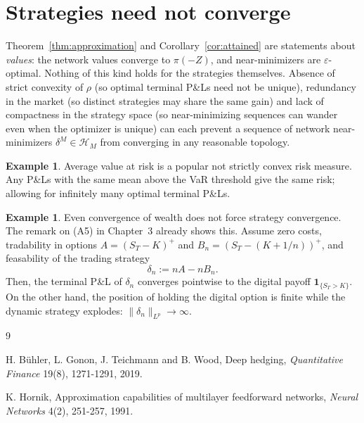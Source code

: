 \documentclass[11pt,a4paper]{report}
\numberwithin{equation}{chapter}
\theoremstyle{plain}
\theoremstyle{definition}
\newtheorem{example}[proposition]{Example}
\newcommand{\HH}{\mathcal{H}}
\begin{document}
\section{Strategies need not converge}
\label{sec:strategies}

Theorem~\ref{thm:approximation} and Corollary~\ref{cor:attained} are
statements about \emph{values}: the network values converge to
$\pi(-Z)$, and near-minimizers are $\varepsilon$-optimal. Nothing of
this kind holds for the strategies themselves. Absence of strict
convexity of $\rho$ (so optimal terminal P\&Ls need not be unique),
redundancy in the market (so distinct strategies may share the same
gain) and lack of compactness in the strategy space (so
near-minimizing sequences can wander even when the optimizer is unique)
can each prevent a sequence of network near-minimizers
$\delta^M\in\HH_M$ from converging in any reasonable topology.

\begin{example}\label{ex:cvar-nonunique}
  Average value at risk is a popular not strictly convex risk measure. Any P\&Ls with the same mean above the VaR threshold give the same risk; allowing for infinitely many optimal terminal P\&Ls.
\end{example}

\begin{example}\label{ex:digital-explosion}
  Even convergence of wealth does not force strategy convergence. The
  remark on (A5) in Chapter~3 already shows this. Assume zero costs,
  tradability in options $A=(S_T-K)^+$ and $B_n=(S_T-(K+1/n))^+$, and feasability of the trading strategy
  \[
    \delta_n:=nA-nB_n.
  \]
  Then, the terminal P\&L of $\delta_n$ converges pointwise to the digital
  payoff $\mathbf{1}_{\{S_T>K\}}$. On the other hand, the position of holding the digital option is finite while the dynamic strategy explodes:
  $\|\delta_n\|_{L^p}\to\infty$.
\end{example}

\begin{thebibliography}{9}

  H. B\"uhler, L. Gonon, J. Teichmann and B. Wood,
  Deep hedging,
  \emph{Quantitative Finance} 19(8), 1271-1291, 2019.

  K. Hornik,
  Approximation capabilities of multilayer feedforward networks,
  \emph{Neural Networks} 4(2), 251-257, 1991.

\end{thebibliography}
\end{document}
